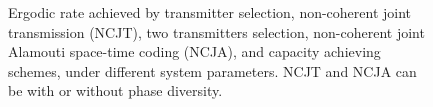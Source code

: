 \documentclass[10pt,journal,a4paper]{IEEEtran}
\begin{document}
\begin{figure}
\centerline{
\hfil
{}
\hfil
{}}
\caption{Ergodic rate achieved by transmitter selection, non-coherent joint transmission (NCJT), two transmitters selection, non-coherent joint Alamouti space-time coding (NCJA), and capacity achieving schemes, under different system parameters. NCJT and NCJA can be with or without phase diversity.}
\label{fig:R_erg}
\end{figure}
\end{document}
